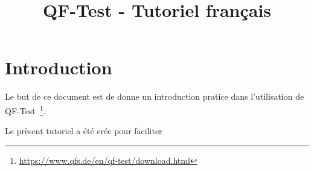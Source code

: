 \documentclass{article}
\begin{document}
\title{QF-Test - Tutoriel français}
\maketitle

\section{Introduction}
\par{
Le but de ce document est de donne un introduction pratice dans l'utilisation de QF-Test~\footnote{\url{https://www.qfs.de/en/qf-test/download.html}}.
}
\par{
Le prèsent tutoriel a été crée pour faciliter
}
\end{document}
